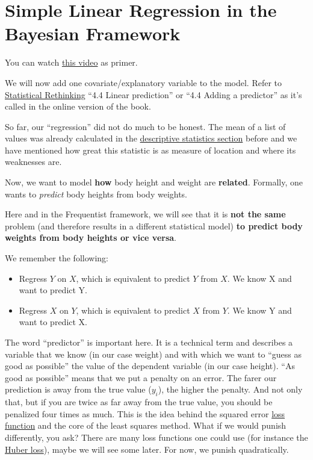 \documentclass[
]{book}
\providecommand{\tightlist}{%
  \setlength{\itemsep}{0pt}\setlength{\parskip}{0pt}}
\begin{document}
\section{Simple Linear Regression in the Bayesian Framework}\label{simple_lin_reg_bayes}

You can watch \href{https://www.youtube.com/watch?v=14mkCpJ7tKs&ab_channel=VeryNormal}{this video} as primer.

We will now add one covariate/explanatory variable to the model.
Refer to \href{https://civil.colorado.edu/~balajir/CVEN6833/bayes-resources/RM-StatRethink-Bayes.pdf}{Statistical Rethinking}
``4.4 Linear prediction'' or ``4.4 Adding a predictor'' as it's called in the online version of the book.

So far, our ``regression'' did not do much to be honest. The mean of a list of values
was already calculated in the \href{https://jdegenfellner.github.io/Script_QM1_ZHAW/descriptive_stats.html}{descriptive statistics section}
before and we have mentioned how great this statistic is as measure of location and where its weaknesses are.

Now, we want to model \textbf{how} body height and weight are \textbf{related}.
Formally, one wants to \emph{predict} body heights from body weights.

Here and in the Frequentist framework, we will see that it is \textbf{not the same}
problem (and therefore results in a different statistical model)
\textbf{to predict body weights from body heights or vice versa}.

We remember the following:

\begin{itemize}
\tightlist
\item
  Regress \(Y\) on \(X\), which is equivalent to predict \(Y\) from \(X\).
  We know X and want to predict Y.
\item
  Regress \(X\) on \(Y\), which is equivalent to predict \(X\) from \(Y\).
  We know Y and want to predict X.
\end{itemize}

The word ``predictor'' is important here. It is a technical term
and describes a variable that we know (in our case weight) and with
which we want to ``guess as good as possible'' the value of the
dependent variable (in our case height). ``As good as possible''
means that we put a penalty on an error. The farer our prediction
is away from the true value (\(y_i\)), the higher the penalty.
And not only that, but if you are twice as far away from the true value,
you should be penalized four times as much. This is the idea behind
the squared error \href{https://en.wikipedia.org/wiki/Loss_function}{loss function}
and the core of the least squares method.
What if we would punish differently, you ask?
There are many loss functions one could use
(for instance the \href{https://en.wikipedia.org/wiki/Huber_loss}{Huber loss}),
maybe we will see some later. For now, we punish quadratically.
\end{document}

